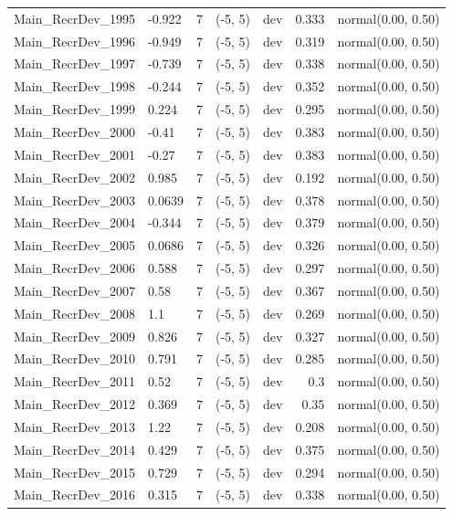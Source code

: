 \documentclass[
]{scrartcl}
\begin{document}
\begin{landscape}
\begin{longtable}{llrllrl}
Main\_RecrDev\_1995 & -0.922 & 7 & (-5, 5) & dev & 0.333 & normal(0.00, 0.50) \\ 
Main\_RecrDev\_1996 & -0.949 & 7 & (-5, 5) & dev & 0.319 & normal(0.00, 0.50) \\ 
Main\_RecrDev\_1997 & -0.739 & 7 & (-5, 5) & dev & 0.338 & normal(0.00, 0.50) \\ 
Main\_RecrDev\_1998 & -0.244 & 7 & (-5, 5) & dev & 0.352 & normal(0.00, 0.50) \\ 
Main\_RecrDev\_1999 & 0.224 & 7 & (-5, 5) & dev & 0.295 & normal(0.00, 0.50) \\ 
Main\_RecrDev\_2000 & -0.41 & 7 & (-5, 5) & dev & 0.383 & normal(0.00, 0.50) \\ 
Main\_RecrDev\_2001 & -0.27 & 7 & (-5, 5) & dev & 0.383 & normal(0.00, 0.50) \\ 
Main\_RecrDev\_2002 & 0.985 & 7 & (-5, 5) & dev & 0.192 & normal(0.00, 0.50) \\ 
Main\_RecrDev\_2003 & 0.0639 & 7 & (-5, 5) & dev & 0.378 & normal(0.00, 0.50) \\ 
Main\_RecrDev\_2004 & -0.344 & 7 & (-5, 5) & dev & 0.379 & normal(0.00, 0.50) \\ 
Main\_RecrDev\_2005 & 0.0686 & 7 & (-5, 5) & dev & 0.326 & normal(0.00, 0.50) \\ 
Main\_RecrDev\_2006 & 0.588 & 7 & (-5, 5) & dev & 0.297 & normal(0.00, 0.50) \\ 
Main\_RecrDev\_2007 & 0.58 & 7 & (-5, 5) & dev & 0.367 & normal(0.00, 0.50) \\ 
Main\_RecrDev\_2008 & 1.1 & 7 & (-5, 5) & dev & 0.269 & normal(0.00, 0.50) \\ 
Main\_RecrDev\_2009 & 0.826 & 7 & (-5, 5) & dev & 0.327 & normal(0.00, 0.50) \\ 
Main\_RecrDev\_2010 & 0.791 & 7 & (-5, 5) & dev & 0.285 & normal(0.00, 0.50) \\ 
Main\_RecrDev\_2011 & 0.52 & 7 & (-5, 5) & dev & 0.3 & normal(0.00, 0.50) \\ 
Main\_RecrDev\_2012 & 0.369 & 7 & (-5, 5) & dev & 0.35 & normal(0.00, 0.50) \\ 
Main\_RecrDev\_2013 & 1.22 & 7 & (-5, 5) & dev & 0.208 & normal(0.00, 0.50) \\ 
Main\_RecrDev\_2014 & 0.429 & 7 & (-5, 5) & dev & 0.375 & normal(0.00, 0.50) \\ 
Main\_RecrDev\_2015 & 0.729 & 7 & (-5, 5) & dev & 0.294 & normal(0.00, 0.50) \\ 
Main\_RecrDev\_2016 & 0.315 & 7 & (-5, 5) & dev & 0.338 & normal(0.00, 0.50) \\ 

\end{longtable}
\end{landscape}
\end{document}
